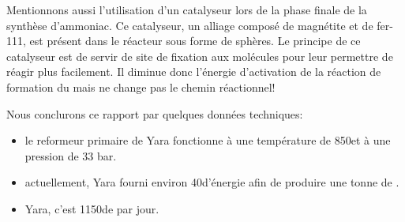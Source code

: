 \documentclass[a4paper,12pt, oneside]{article}
\begin{document}
	Mentionnons aussi l'utilisation d'un catalyseur lors de la phase finale de la synthèse d'ammoniac. Ce catalyseur, un alliage composé de magnétite et de fer-111, est présent dans le réacteur sous forme de sphères. Le principe de ce catalyseur est de servir de site de fixation aux molécules pour leur permettre de réagir plus facilement. Il diminue donc l'énergie d'activation de la réaction de formation du  mais ne change pas le chemin réactionnel!
	
	Nous conclurons ce rapport par quelques données techniques:
	\begin{itemize}
	\item le reformeur primaire de Yara fonctionne à une température de 850\celsius et à une pression de 33 bar.
	\item actuellement, Yara fourni environ 40\giga\joule d'énergie afin de produire une tonne de .
	\item Yara, c'est 1150\tonne de  par jour. 
	\end{itemize}
		
		
\end{document}
